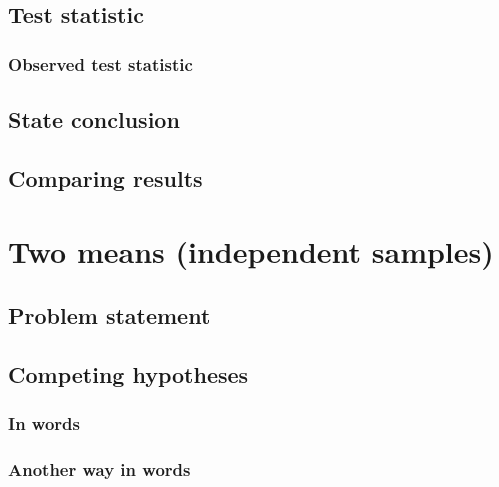 \documentclass[12pt, krantz2,]{krantz}
\begin{document}
\hypertarget{test-statistic-2}{%
\subsection{Test statistic}\label{test-statistic-2}}

\hypertarget{observed-test-statistic-2}{%
\subsubsection*{Observed test statistic}\label{observed-test-statistic-2}}


\hypertarget{state-conclusion-2}{%
\subsection{State conclusion}\label{state-conclusion-2}}

\hypertarget{comparing-results-2}{%
\subsection{Comparing results}\label{comparing-results-2}}

\hypertarget{two-means-independent-samples}{%
\section{Two means (independent samples)}\label{two-means-independent-samples}}

\hypertarget{problem-statement-3}{%
\subsection{Problem statement}\label{problem-statement-3}}

\hypertarget{competing-hypotheses-3}{%
\subsection{Competing hypotheses}\label{competing-hypotheses-3}}

\hypertarget{in-words-3}{%
\subsubsection*{In words}\label{in-words-3}}


\hypertarget{another-way-in-words-1}{%
\subsubsection*{Another way in words}\label{another-way-in-words-1}}
\end{document}
